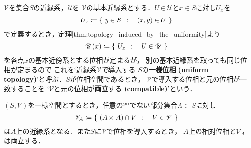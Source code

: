 	\begin{screen}
		\begin{dfn}[一様位相]
			$\mathscr{V}$を集合$S$の近縁系，$\mathscr{U}$を
			$\mathscr{V}$の基本近縁系とする．$U \in \mathscr{U}$と$x \in S$に対し$U_x$を
			\begin{align}
				U_x \coloneqq \left\{\ y \in S\ \, : \quad (x,y) \in U\ \right\}
			\end{align}
			で定義するとき，定理\ref{thm:topology_induced_by_the_uniformity}より
			\begin{align}
				\mathscr{U}(x) \coloneqq \left\{\ U_x\ \, : \quad U \in \mathscr{U}\ \right\}
			\end{align}
			を各点$x$の基本近傍系とする位相が定まるが，
			別の基本近縁系を取っても同じ位相が定まるので
			これを`近縁系$\mathscr{V}$で導入する
			$S$の{\bf 一様位相}
			{\bf (uniform topology)}'と呼ぶ．$S$が位相空間であるとき，
			$\mathscr{V}$で導入する位相と元の位相が一致することを
			`$\mathscr{V}$と元の位相が{\bf 両立}する
			{\bf (compatible)}'という．
		\end{dfn}
	\end{screen}
	
	\begin{screen}
		\begin{thm}[部分一様空間]
			$(S,\mathscr{V})$を一様空間とするとき，任意の空でない部分集合$A \subset S$に対し
			\begin{align}
				\mathscr{V}_A \coloneqq 
				\left\{\ (A \times A) \cap V\ \, : \quad V \in \mathscr{V}\ \right\}
			\end{align}
			は$A$上の近縁系となる．また$S$に$\mathscr{V}$で位相を導入するとき，
			$A$上の相対位相と$\mathscr{V}_A$は両立する．
		\end{thm}
	\end{screen}
	
